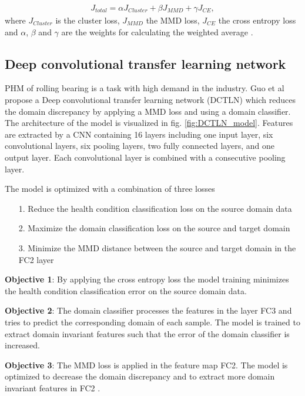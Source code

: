 \begin{equation}
    \begin{aligned}
    J_{total} = \alpha J_{Cluster} + \beta J_{MMD} + \gamma J_{CE}, 
    \end{aligned}
\end{equation}
where $J_{Cluster}$ is the cluster loss, $J_{MMD}$ the MMD loss,  $J_{CE}$ the cross entropy loss and $\alpha$, $\beta$ and $\gamma$ are the weights for calculating the weighted average \cite{Li2018}.


\subsection{Deep convolutional transfer learning network}
PHM of rolling bearing is a task with high demand in the industry. Guo et al \cite{Guo2019} propose a Deep convolutional transfer learning network (DCTLN) which reduces the domain discrepancy by applying a MMD loss and using a domain classifier. The architecture of the model is visualized in fig. \ref{fig:DCTLN_model}. Features are extracted by a CNN containing 16 layers including one input layer, six convolutional layers, six pooling layers, two fully connected layers, and one output layer. Each convolutional layer is combined with a consecutive pooling layer.


The model is optimized with a combination of three losses
\begin{itemize}
    \item [1.] Reduce the health condition classification loss on the source domain data
    \item [2.] Maximize the domain classification loss on the source and target domain 
    \item [3.] Minimize the MMD distance between the source and target domain in the FC2 layer
\end{itemize}

\textbf{Objective 1}: By applying the cross entropy loss the model training minimizes the health condition classification error on the source domain data.

\textbf{Objective 2}: The domain classifier processes the features in the layer FC3 and tries to predict the corresponding domain of each sample. The model is trained to extract domain invariant features such that the error of the domain classifier is increased.

\textbf{Objective 3}: The MMD loss is applied in the feature map FC2. The model is optimized to decrease the domain discrepancy and to extract more domain invariant features in FC2 \cite{Guo2019}. 

